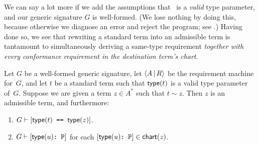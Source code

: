 \documentclass[../generics]{subfiles}
\begin{document}
We can say a lot more if we add the assumptions that \tT\ is a \emph{valid} type parameter, and our generic signature $G$ is well-formed. (We lose nothing by doing this, because otherwise we diagnose an error and reject the program; see .) Having done so, we see that rewriting a standard term into an admissible term is tantamount to simultaneously deriving a same-type requirement \textsl{together with every conformance requirement in the destination term's chart}.

\begin{theorem}\label{type chart theorem}
Let $G$ be a well-formed generic signature, let $\langle A\,|\,R\rangle$ be the requirement machine for~$G$, and let $t$ be a standard term such that $\mathsf{type}(t)$ is a valid type parameter of~$G$. Suppose we are given a term $z\in A^*$ such that $t \sim z$. Then $z$ is an admissible term, and furthermore:
\begin{enumerate}
\item $G \vdash [\texttt{$\mathsf{type}(t)$ == $\mathsf{type}(z)$}]$.
\item $G \vdash [\texttt{$\mathsf{type}(u)$:~P}]$ for each $[\texttt{$\mathsf{type}(u)$:~P}]\in\mathsf{chart}(z)$.
\end{enumerate}
\end{theorem}
\end{document}
